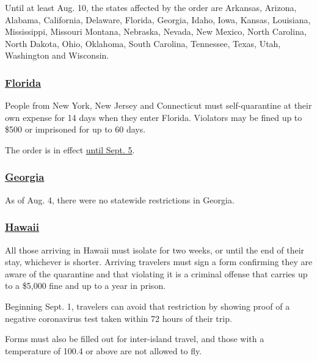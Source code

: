 Until at least Aug. 10, the states affected by the order are Arkansas,
Arizona, Alabama, California, Delaware, Florida, Georgia, Idaho, Iowa,
Kansas, Louisiana, Mississippi, Missouri Montana, Nebraska, Nevada, New
Mexico, North Carolina, North Dakota, Ohio, Oklahoma, South Carolina,
Tennessee, Texas, Utah, Washington and Wisconsin.

\hypertarget{florida}{%
\subsubsection{\texorpdfstring{\href{https://floridahealthcovid19.gov/travelers/}{Florida}}{Florida}}\label{florida}}

People from New York, New Jersey and Connecticut must self-quarantine at
their own expense for 14 days when they enter Florida. Violators may be
fined up to \$500 or imprisoned for up to 60 days.

The order is in effect
\href{https://www.flgov.com/wp-content/uploads/orders/2020/EO_20-166.pdf}{until
Sept. 5}.

\hypertarget{georgia}{%
\subsubsection{\texorpdfstring{\href{https://dph.georgia.gov/covid-19-travel}{Georgia}}{Georgia}}\label{georgia}}

As of Aug. 4, there were no statewide restrictions in Georgia.

\hypertarget{hawaii}{%
\subsubsection{\texorpdfstring{\href{https://www.hawaiitourismauthority.org/news/alerts/covid-19-novel-coronavirus/}{Hawaii}}{Hawaii}}\label{hawaii}}

All those arriving in Hawaii must isolate for two weeks, or until the
end of their stay, whichever is shorter. Arriving travelers must sign a
form confirming they are aware of the quarantine and that violating it
is a criminal offense that carries up to a \$5,000 fine and up to a year
in prison.

Beginning Sept. 1, travelers can avoid that restriction by showing proof
of a negative coronavirus test taken within 72 hours of their trip.

Forms must also be filled out for inter-island travel, and those with a
temperature of 100.4 or above are not allowed to fly.

